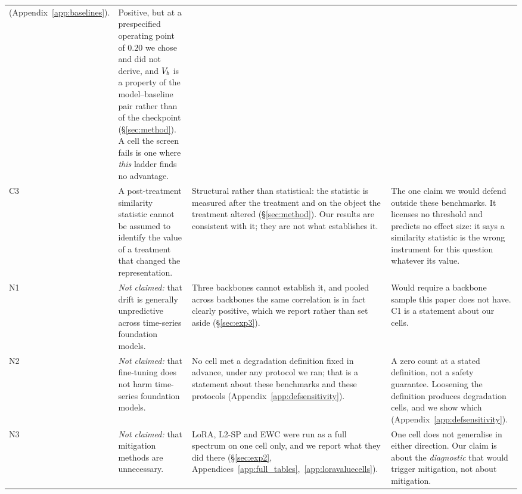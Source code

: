 \begin{table}[ht]
\begin{tabular}{@{}p{}p{}p{}p{}@{}}
     (Appendix~\ref{app:baselines}).
   & Positive, but at a prespecified operating point of $0.20$ we chose and did
     not derive, and $V_{b}$ is a property of the model--baseline pair rather
     than of the checkpoint (\S\ref{sec:method}).  A cell the screen fails is one
     where \emph{this} ladder finds no advantage. \\
\addlinespace
C3 & A post-treatment similarity statistic cannot be assumed to identify the
     value of a treatment that changed the representation.
   & Structural rather than statistical: the statistic is measured after the
     treatment and on the object the treatment altered
     (\S\ref{sec:method}).  Our results are consistent with it; they are not what
     establishes it.
   & The one claim we would defend outside these benchmarks.  It licenses no
     threshold and predicts no effect size: it says a similarity statistic is
     the wrong instrument for this question whatever its value. \\
\midrule
N1 & \emph{Not claimed:} that drift is generally unpredictive across time-series
     foundation models.
   & Three backbones cannot establish it, and pooled across backbones the same
     correlation is in fact clearly positive, which we report rather than set
     aside (\S\ref{sec:exp3}).
   & Would require a backbone sample this paper does not have.  C1 is a
     statement about our cells. \\
\addlinespace
N2 & \emph{Not claimed:} that fine-tuning does not harm time-series foundation
     models.
   & No cell met a degradation definition fixed in advance, under any protocol we
     ran; that is a statement about these benchmarks and these protocols
     (Appendix~\ref{app:defsensitivity}).
   & A zero count at a stated definition, not a safety guarantee.  Loosening the
     definition produces degradation cells, and we show which
     (Appendix~\ref{app:defsensitivity}). \\
\addlinespace
N3 & \emph{Not claimed:} that mitigation methods are unnecessary.
   & LoRA, L2-SP and EWC were run as a full spectrum on one cell only, and we
     report what they did there (\S\ref{sec:exp2},
     Appendices~\ref{app:full_tables},~\ref{app:loravaluecells}).
   & One cell does not generalise in either direction.  Our claim is about the
     \emph{diagnostic} that would trigger mitigation, not about mitigation. \\
\bottomrule
\end{tabular}
\end{table}

